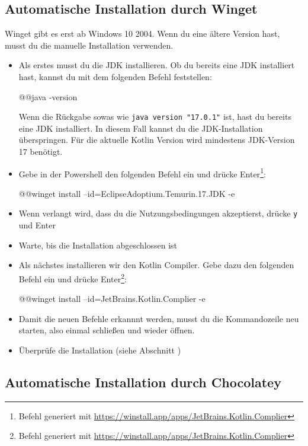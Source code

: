 \subsection*{Automatische Installation durch Winget}
\begin{hinweis}
    Winget gibt es erst ab Windows 10 2004. Wenn du eine ältere Version hast, musst du die manuelle Installation verwenden.
\end{hinweis}
\begin{itemize}
    \item Als erstes musst du die JDK installieren. Ob du bereits eine JDK installiert hast, kannst du mit dem folgenden Befehl feststellen:
    \begin{commandshell}
        @\shellprefix{}@java -version
    \end{commandshell}
    Wenn die Rückgabe sowas wie \verb+java version "17.0.1"+ ist, hast du bereits eine JDK installiert. In diesem Fall kannst du die JDK-Installation überspringen. Für die aktuelle Kotlin Version wird mindestens JDK-Version 17 benötigt.
    \item Gebe in der Powershell den folgenden Befehl ein und drücke Enter\footnote{Befehl generiert mit \url{https://winstall.app/apps/JetBrains.Kotlin.Complier}}:
    \begin{commandshell}
        @\shellprefix{}@winget install --id=EclipseAdoptium.Temurin.17.JDK -e
    \end{commandshell}
    \item Wenn verlangt wird, dass du die Nutzungsbedingungen akzeptierst, drücke \texttt{y} und Enter
    \item Warte, bis die Installation abgeschlossen ist
    \item Als nächstes installieren wir den Kotlin Compiler. Gebe dazu den folgenden Befehl ein und drücke Enter\footnote{Befehl generiert mit \url{https://winstall.app/apps/JetBrains.Kotlin.Complier}}:
    \begin{commandshell}
        @\shellprefix{}@winget install --id=JetBrains.Kotlin.Complier -e
    \end{commandshell}
    \item Damit die neuen Befehle erkannnt werden, musst du die Kommandozeile neu starten, also einmal schließen und wieder öffnen.
    \item Überprüfe die Installation (siehe Abschnitt )
\end{itemize}
\subsection*{Automatische Installation durch Chocolatey}
